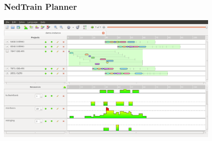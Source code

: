 \begin{frame}\frametitle{NedTrain Planner}
	\begin{center}
		\includegraphics[width=11cm]{images/TMSconflictGUI.png}
	\end{center}
\end{frame}

